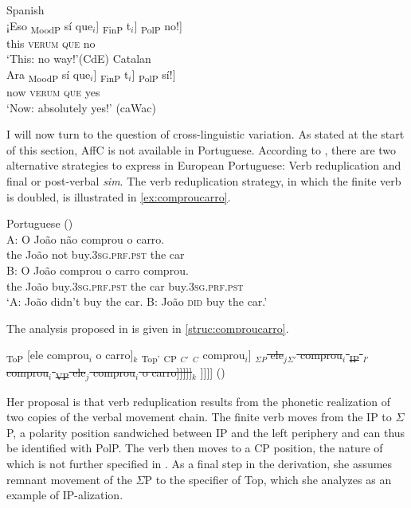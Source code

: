 \ea\label{ex:siquesi}
\ea
		Spanish\\
\gll ¡Eso {\ob}\textsubscript{MoodP} sí que$_i$] {\ob}\textsubscript{FinP} t$_i$] {\ob}\textsubscript{PolP} no!] \\ 
this {} \textsc{verum} \textsc{que} {} {} {} no\\
\glt `This:  no way!'(CdE)
\ex
Catalan\\
\gll Ara {\ob}\textsubscript{MoodP} sí que$_i$] {\ob}\textsubscript{FinP} t$_i$] {\ob}\textsubscript{PolP} sí!] \\
now {} \textsc{verum} \textsc{que} {} {} {} yes\\
\glt `Now: absolutely yes!' (caWac)
\z
\z


I will now turn to the question of  cross-linguistic variation. As  stated at the start of this section, AffC is not available in  Portuguese.  According to \citet{Martins2013}, there are two alternative strategies to express  in European Portuguese:  Verb reduplication and final or post-verbal \emph{sim}. The verb reduplication strategy, in which the finite verb is doubled, is illustrated in \eqref{ex:comproucarro}.

\ea\label{ex:comproucarro}Portuguese (\citealt[97: ex 1]{Martins2013})\\  \gll A: O João não comprou o carro. \\
{} the João not buy.\textsc{3sg.prf.pst} the car\\
\exi{}\gll B: O João comprou o carro comprou.\\
{} the João  buy.\textsc{3sg.prf.pst} the car buy.\textsc{3sg.prf.pst}\\
\glt `A: João didn't buy the car. B: João \textsc{did} buy the car.' 
\z



The analysis proposed in \citet{Martins2013} is given in \eqref{struc:comproucarro}. 

\ea\label{struc:comproucarro} {\ob}\textsubscript{ToP} [ele comprou$_i$ o carro]$_k$ {\ob}\textsubscript{Top'} {\ob}\textsubscript{CP} {\ob}$_{C'}$ {\ob}$_{C}$ comprou$_i$] 
	\sout{{\ob}$_{\Sigma P}$ ele$_j${\ob}$_{\Sigma'}$ comprou$_i$ {\ob}\textsubscript{IP} {\ob}$_{I'}$ comprou$_i$ {\ob}\textsubscript{VP} ele$_j$ comprou$_i$ o carro]]]]]$_k$} ]]]] (\citealt[101: 8c]{Martins2013})
\z



Her proposal is that verb reduplication results from the phonetic realization of two copies of the verbal movement chain. The finite verb moves from the IP to $\Sigma$P, a polarity position sandwiched between IP and the left periphery and can thus be identified with PolP. The verb  then moves to a CP position, the nature of which is not further specified in \citet{Martins2013}.  As a final step in the derivation, she assumes remnant movement of the $\Sigma$P to the specifier of Top, which she analyzes as an example of IP-alization.  

